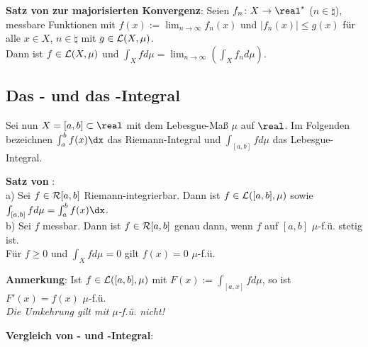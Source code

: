 \textbf{Satz von  zur majorisierten Konvergenz}:
Seien $f_n\colon X \rightarrow \real^\ast$ ($n \in \natural$),
messbare Funktionen mit
$f(x) := \lim_{n \to \infty} f_n(x)$ und
$|f_n(x)| \le g(x)$ für alle $x \in X$, $n \in \natural$
mit $g \in \mathcal{L}(X, \mu)$. \\
Dann ist $f \in \mathcal{L}(X, \mu)$ und
$\int_X f d\mu = \lim_{n \to \infty} \left(\int_X f_n d\mu\right)$.

\subsection{%
    Das - und das -Integral%
}

Sei nun $X = [a, b] \subset \real$ mit dem Lebesgue-Maß $\mu$ auf $\real$.
Im Folgenden bezeichnen $\int_a^b f(x)\dx$ das Riemann-Integral und
$\int_{[a,b]} f d\mu$ das Lebesgue-Integral.

\textbf{Satz von }: \\
a) Sei $f \in \mathcal{R}[a, b]$ Riemann-integrierbar.
Dann ist $f \in \mathcal{L}([a,b], \mu)$ sowie
$\int_{[a,b]} f d\mu = \int_a^b f(x)\dx$. \\
b) Sei $f$ messbar.
Dann ist $f \in \mathcal{R}[a, b]$ genau dann, wenn $f$ auf $[a, b]$ $\mu$-f.ü.
stetig ist. \\
Für $f \ge 0$ und $\int_X f d\mu = 0$ gilt $f(x) = 0$ $\mu$-f.ü.

\textbf{Anmerkung}:
Ist $f \in \mathcal{L}([a, b], \mu)$ mit $F(x) := \int_{[a, x]} f d\mu$, so ist
$F'(x) = f(x)$ $\mu$-f.ü. \\
\emph{Die Umkehrung gilt mit $\mu$-f.ü. nicht!}

\linie

\textbf{Vergleich von - und -Integral}:

